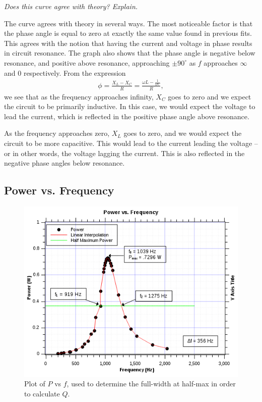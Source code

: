 \documentclass[twocolumn,english]{IEEEtran}
\theoremstyle{plain}
\theoremstyle{plain}
\begin{document}
\textit{Does this curve agree with theory? Explain.}

The curve agrees with theory in several ways. The most noticeable factor is that the phase angle is equal to zero at exactly the same value found in previous fits. This agrees with the notion that having the current and voltage in phase results in circuit resonance. The graph also shows that the phase angle is negative below resonance, and positive above resonance, approaching $\pm 90^{\circ}$ as $f$ approaches $\infty$ and $0$ respectively. From the expression
\begin{align}
	\phi = \frac{X_L-X_C}{R} = \frac{\omega L - \frac{1}{\omega C}}{R},
\end{align}
we see that as the frequency approaches infinity, $X_C$ goes to zero and we expect the circuit to be primarily inductive. In this case, we would expect the voltage to lead the current, which is reflected in the positive phase angle above resonance.

As the frequency approaches zero, $X_L$ goes to zero, and we would expect the circuit to be more capacitive. This would lead to the current leading the voltage -- or in other words, the voltage lagging the current. This is also reflected in the negative phase angles below resonance.

\hrulefill

\subsection{Power vs. Frequency}

\begin{figure}[H]
	\begin{centering}
	\begin{center}
	\includegraphics[width=\linewidth]{./Part8.png}
	\caption{Plot of $P$ vs $f$, used to determine the full-width at half-max in order to calculate $Q$.}
	\label{fig:PowervsFreq}
	\end{center}
	\par\end{centering}
\end{figure}
\end{document}
